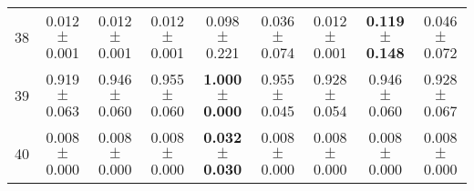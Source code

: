 \begin{table}[!ht]
{\begin{tabular}{r c c c c c c c c}
38 & 0.012 $\pm$ 0.001 & 0.012 $\pm$ 0.001 & 0.012 $\pm$ 0.001 & 0.098 $\pm$ 0.221 & 0.036 $\pm$ 0.074 & 0.012 $\pm$ 0.001 & \textbf{0.119 $\pm$ 0.148} & 0.046 $\pm$ 0.072 \\
39 & 0.919 $\pm$ 0.063 & 0.946 $\pm$ 0.060 & 0.955 $\pm$ 0.060 & \textbf{1.000 $\pm$ 0.000} & 0.955 $\pm$ 0.045 & 0.928 $\pm$ 0.054 & 0.946 $\pm$ 0.060 & 0.928 $\pm$ 0.067 \\
40 & 0.008 $\pm$ 0.000 & 0.008 $\pm$ 0.000 & 0.008 $\pm$ 0.000 & \textbf{0.032 $\pm$ 0.030} & 0.008 $\pm$ 0.000 & 0.008 $\pm$ 0.000 & 0.008 $\pm$ 0.000 & 0.008 $\pm$ 0.000 \\
\end{tabular}}
\end{table}
